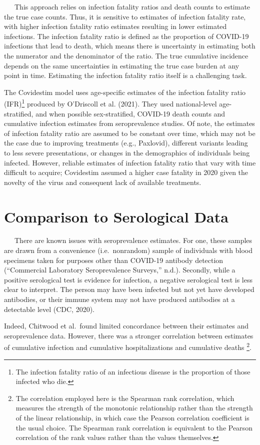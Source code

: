 \documentclass[12pt,twoside]{smiththesis}
\begin{document}
~~~This approach relies on infection fatality ratios and death counts to estimate the true case counts. Thus, it is sensitive to estimates of infection fatality rate, with higher infection fatality ratio estimates resulting in lower estimated infections. The infection fatality ratio is defined as the proportion of COVID-19 infections that lead to death, which means there is uncertainty in estimating both the numerator and the denominator of the ratio. The true cumulative incidence depends on the same uncertainties in estimating the true case burden at any point in time. Estimating the infection fatality ratio itself is a challenging task.

The Covidestim model uses age-specific estimates of the infection fatality ratio (IFR)\footnote{The infection fatality ratio of an infectious disease is the proportion of those infected who die.} produced by O'Driscoll et al. (2021). They used national-level age-stratified, and when possible sex-stratified, COVID-19 death counts and cumulative infection estimates from seroprevalence studies. Of note, the estimates of infection fatality ratio are assumed to be constant over time, which may not be the case due to improving treatments (e.g., Paxlovid), different variants leading to less severe presentations, or changes in the demographics of individuals being infected. However, reliable estimates of infection fatality ratio that vary with time difficult to acquire; Covidestim assumed a higher case fatality in 2020 given the novelty of the virus and consequent lack of available treatments.

\hypertarget{comparison-to-serological-data}{%
\section{Comparison to Serological Data}\label{comparison-to-serological-data}}

~~~There are known issues with seroprevalence estimates. For one, these samples are drawn from a convenience (i.e.~nonrandom) sample of individuals with blood specimens taken for purposes other than COVID-19 antibody detection ({``Commercial {Laboratory Seroprevalence Surveys},''} n.d.). Secondly, while a positive serological test is evidence for infection, a negative serological test is less clear to interpret. The person may have been infected but not yet have developed antibodies, or their immune system may not have produced antibodies at a detectable level (CDC, 2020).

Indeed, Chitwood et al.~found limited concordance between their estimates and seroprevalence data. However, there was a stronger correlation between estimates of cumulative infection and cumulative hospitalizations and cumulative deaths \footnote{The correlation employed here is the Spearman rank correlation, which measures the strength of the monotonic relationship rather than the strength of the linear relationship, in which case the Pearson correlation coefficient is the usual choice. The Spearman rank correlation is equivalent to the Pearson correlation of the rank values rather than the values themselves. }.
\end{document}
